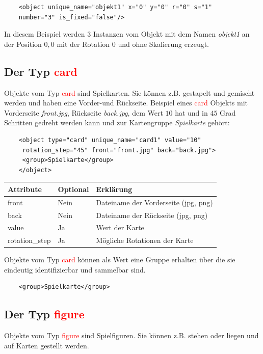 \documentclass[ngerman]{scrbook}
\newcommand{\card}{\textcolor{red}{card}\xspace}
\newcommand{\gamefigure}{\textcolor{red}{figure}\xspace}
\begin{document}
	\lstset{language=XML}
	\begin{lstlisting}
	<object unique_name="objekt1" x="0" y="0" r="0" s="1" 
	number="3" is_fixed="false"/>
	\end{lstlisting}
	
	In diesem Beispiel werden $3$ Instanzen vom Objekt mit dem Namen \textit{objekt1} an der Position $0,0$ mit der Rotation $0$ und ohne Skalierung erzeugt.

	
	\subsection{Der Typ \card}
	Objekte vom Typ \card sind Spielkarten. Sie können z.B. gestapelt und gemischt werden und haben eine Vorder-und Rückseite.
	Beispiel eines \card Objekts mit Vorderseite \textit{front.jpg}, Rückseite \textit{back.jpg}, dem Wert $10$ hat und in $45$ Grad Schritten gedreht werden kann und zur Kartengruppe \textit{Spielkarte} gehört:
	
	\lstset{language=XML}
	\begin{lstlisting}
	<object type="card" unique_name="card1" value="10"
	 rotation_step="45" front="front.jpg" back="back.jpg">
	 <group>Spielkarte</group>
	</object>
	\end{lstlisting}
	
	\begin{table}[!h]
		\renewcommand{\arraystretch}{1.5}		\begin{tabularx}{\textwidth}{XXX}
			Attribute & Optional & Erklärung\\\hline
			front & Nein & Dateiname der Vorderseite (jpg, png)\\
			back & Nein & Dateiname der Rückseite (jpg, png)\\
			value & Ja & Wert der Karte\\
			rotation\_step & Ja & Mögliche Rotationen der Karte\\
		\end{tabularx}
	\end{table}

	Objekte vom Typ \card können als Wert eine Gruppe erhalten über die sie eindeutig identifizierbar und sammelbar sind.

	\lstset{language=XML}
	\begin{lstlisting}	
	<group>Spielkarte</group>
	\end{lstlisting}

	\subsection{Der Typ \gamefigure}
	Objekte vom Typ \gamefigure sind Spielfiguren. Sie können z.B. stehen oder liegen und auf Karten gestellt werden.
\end{document}
